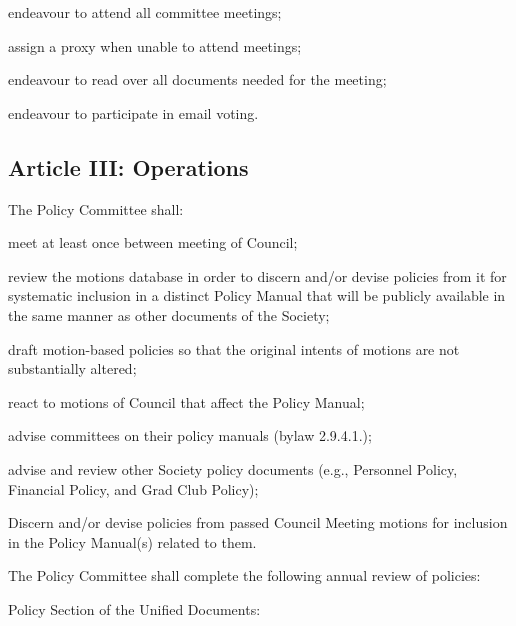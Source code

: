 \begin{longenum}[ label*=\thesubsection.\arabic*., align=left]
\begin{longenum}[label*=\arabic*., align=left]
\begin{longenum}[label*=\arabic*., align=left]
\begin{longenum}[label*=\arabic*., align=left]
			\item endeavour to attend all committee meetings;
			\item assign a proxy when unable to attend meetings;
			\item endeavour to read over all documents needed for the meeting;
			\item endeavour to participate in email voting.
			\end{longenum}										
		\end{longenum}
	\end{longenum}
\end{longenum}

\subsection{Article III: Operations}
\begin{longenum}[ label*=\thesubsection.\arabic*., align=left] 
\item The Policy Committee shall:
	\begin{longenum}[label*=\arabic*., align=left]
	\item meet at least once between meeting of Council;
	\item review the motions database in order to discern and/or devise policies from it for systematic inclusion in a distinct Policy Manual that will be publicly available in the same manner as other documents of the Society;
	\item draft motion-based policies so that the original intents of motions are not substantially altered;
	\item react to motions of Council that affect the Policy Manual;
	\item advise committees on their policy manuals (bylaw 2.9.4.1.);
	\item advise and review other Society policy documents (e.g., Personnel Policy, Financial Policy, and Grad Club Policy);
	\item Discern and/or devise policies from passed Council Meeting motions for inclusion in the Policy Manual(s) related to them.
	\end{longenum}
\item The Policy Committee shall complete the following annual review of policies:
	\begin{longenum}[label*=\arabic*., align=left]	
	\item Policy Section of the Unified Documents:
		\begin{longenum}[label*=\arabic*., align=left]	

\end{longenum}
\end{longenum}
\end{longenum}
